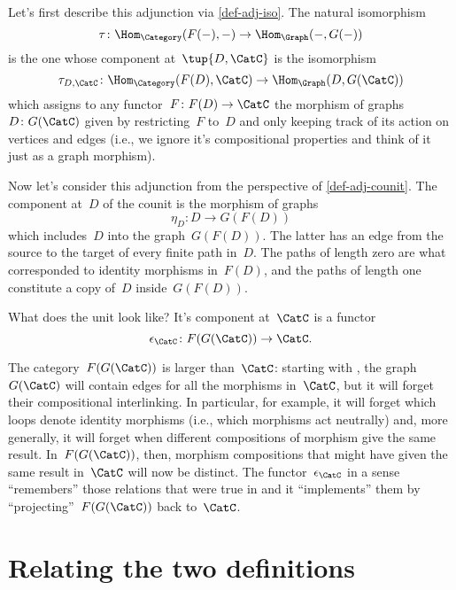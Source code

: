 Let's first describe this adjunction via \cref{def-adj-iso}. The natural isomorphism
\begin{equation*}
    \tau\colon \Hom_{\Category}(F(- ), - ) \to \Hom_{\Graph}(- , G( - ))
\end{equation*}
is the one whose component at~$\tup{D,\CatC}$ is the isomorphism
\begin{equation*}
    \tau_{D,\CatC} \colon \Hom_{\Category}(F(D), \CatC) \to \Hom_{\Graph}(D, G(\CatC))
\end{equation*}
which assigns to any functor~$F\colon F(D) \to \CatC$ the morphism of graphs~$D \colon G(\CatC)$ given by restricting~$F$ to~$D$ and only keeping track of its action on vertices and edges (i.e., we ignore it's compositional properties and think of it just as a graph morphism).

Now let's consider this adjunction from the perspective of \cref{def-adj-counit}. The component at~$D$ of the counit is the morphism of graphs
\begin{equation*}
    \eta_D \colon D \to  G(F(D))
\end{equation*}
which includes~$D$ into the graph~$G(F(D))$. The latter has an edge from the source to the target of every finite path in~$D$. The paths of length zero are what corresponded to identity morphisms in~$F(D)$, and the paths of length one constitute a copy of~$D$ inside~$G(F(D))$.

What does the unit look like? It's component at~$\CatC$ is a functor
\begin{equation*}
    \epsilon_{\CatC} \colon F(G(\CatC)) \to \CatC.
\end{equation*}

The category~$F(G(\CatC))$ is larger than~$\CatC$: starting with \CatC, the graph~$G(\CatC)$ will contain edges for all the morphisms in~$\CatC$, but it will forget their compositional interlinking. In particular, for example, it will forget which loops denote identity morphisms (i.e., which morphisms act neutrally) and, more generally, it will forget when different compositions of morphism give the same result. In~$F(G(\CatC))$, then, morphism compositions that might have given the same result in~$\CatC$ will now be distinct.
The functor~$\epsilon_{\CatC}$ in a sense ``remembers'' those relations that were true in \CatC and it ``implements'' them by ``projecting''~$F(G(\CatC))$ back to~$\CatC$.


\section{Relating the two definitions}
\label{relate-adj-defs}

